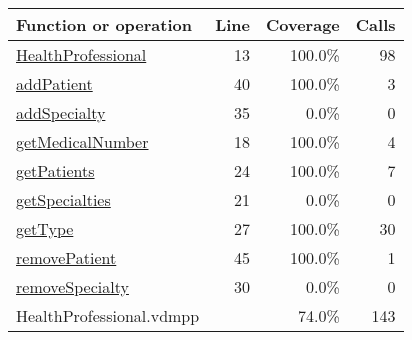 \bigskip
\begin{longtable}{|l|r|r|r|}
\hline
Function or operation & Line & Coverage & Calls \\
\hline
\hline
\hyperref[HealthProfessional:13]{HealthProfessional} & 13&100.0\% & 98 \\
\hline
\hyperref[addPatient:40]{addPatient} & 40&100.0\% & 3 \\
\hline
\hyperref[addSpecialty:35]{addSpecialty} & 35&0.0\% & 0 \\
\hline
\hyperref[getMedicalNumber:18]{getMedicalNumber} & 18&100.0\% & 4 \\
\hline
\hyperref[getPatients:24]{getPatients} & 24&100.0\% & 7 \\
\hline
\hyperref[getSpecialties:21]{getSpecialties} & 21&0.0\% & 0 \\
\hline
\hyperref[getType:27]{getType} & 27&100.0\% & 30 \\
\hline
\hyperref[removePatient:45]{removePatient} & 45&100.0\% & 1 \\
\hline
\hyperref[removeSpecialty:30]{removeSpecialty} & 30&0.0\% & 0 \\
\hline
\hline
HealthProfessional.vdmpp & & 74.0\% & 143 \\
\hline
\end{longtable}

